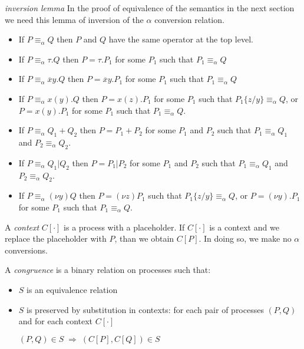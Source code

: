 \begin{lemma}{\emph{inversion lemma}}
  In the proof of equivalence of the semantics in the next section we need this lemma of inversion of the $\alpha$ conversion relation.
  \begin{itemize}
    \item 
      If $P\equiv_{\alpha} Q$ then $P$ and $Q$ have the same operator at the top level. 
    \item
      If $P\equiv_{\alpha} \tau.Q$ then $P=\tau.P_{1}$ for some $P_{1}$ such that $P_{1}\equiv_{\alpha}Q$
    \item
      If $P\equiv_{\alpha} \overline{x}y.Q$ then $P=\overline{x}y.P_{1}$ for some $P_{1}$ such that $P_{1}\equiv_{\alpha}Q$
    \item
      If $P\equiv_{\alpha} x(y).Q$ then $P=x(z).P_{1}$ for some $P_{1}$ such that $P_{1}\{z/y\}\equiv_{\alpha}Q$, or $P=x(y).P_{1}$ for some $P_{1}$ such that $P_{1}\equiv_{\alpha}Q$.
    \item
      If $P\equiv_{\alpha} Q_{1}+Q_{2}$ then $P=P_{1}+P_{2}$ for some $P_{1}$ and $P_{2}$ such that $P_{1}\equiv_{\alpha}Q_{1}$ and $P_{2}\equiv_{\alpha}Q_{2}$.
    \item 
      If $P\equiv_{\alpha} Q_{1}|Q_{2}$ then $P=P_{1}|P_{2}$ for some $P_{1}$ and $P_{2}$ such that $P_{1}\equiv_{\alpha}Q_{1}$ and $P_{2}\equiv_{\alpha}Q_{2}$.
    \item 
      If $P\equiv_{\alpha} (\nu y)Q$ then $P=(\nu z)P_{1}$ such that $P_{1}\{z/y\}\equiv_{\alpha}Q$, or $P=(\nu y).P_{1}$ for some $P_{1}$ such that $P_{1}\equiv_{\alpha}Q$.
  \end{itemize}

\end{lemma}



\begin{definition}
  A \emph{context} $C[\cdot]$ is a process with a placeholder. If $C[\cdot]$ is a context and we replace the placeholder with $P$, than we obtain $C[P]$. In doing so, we make no $\alpha$ conversions.
\end{definition}


\begin{definition}
  A \emph{congruence} is a binary relation on processes such that:
  \begin{itemize}
    \item 
      $S$ is an equivalence relation
    \item 
      $S$ is preserved by substitution in contexts: for each pair of processes $(P, Q)$ and for each context $C[\cdot]$
      \begin{center}
	$(P,Q)\in S\; \Rightarrow\; (C[P], C[Q])\in S$
      \end{center}
  \end{itemize}
\end{definition}

